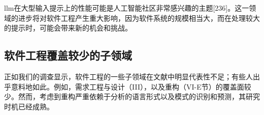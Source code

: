 \begin{translation}
llm在大型输入提示上的性能可能是人工智能社区非常感兴趣的主题[236]。这一领域的进步将对软件工程产生重大影响，因为软件系统的规模相当大，而在处理较大的提示时，可能会带来新的机会和挑战。

\subsection{软件工程覆盖较少的子领域}

正如我们的调查显示，软件工程的一些子领域在文献中明显代表性不足；有些人出乎意料地如此。例如，需求工程与设计（III），以及重构（VI-E节）的覆盖面较少。然而，考虑到重构严重依赖于分析的语言形式以及模式的识别和预测，其研究时机已经成熟。



% 

\printbibliography

\begin{translation-index}
  \nocite{fan2023large}
  
  \printbibliography
\end{translation-index}

\end{translation}
